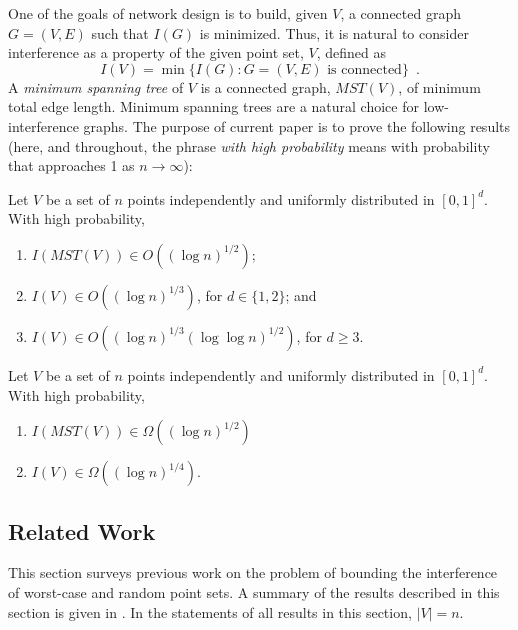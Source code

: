 \documentclass{patmorin}
\newcommand{\mst}{\mathit{MST}}
\begin{document}
One of the goals of network design is to build, given $V$, a connected
graph $G=(V,E)$ such that $I(G)$ is minimized.  Thus, it is natural to consider interference as a property of the given point set, $V$, defined as
\[
  I(V) = \min\{I(G) : \mbox{$G=(V,E)$ is connected}\} \enspace .
\]
A \emph{minimum spanning tree} of $V$ is a connected graph, $\mst(V)$,
of minimum total edge length.  Minimum spanning trees are a natural
choice for low-interference graphs.  The purpose of current paper
is to prove the following results (here, and throughout, the phrase
\emph{with high probability} means with probability that approaches 1
as $n\rightarrow\infty$):
\begin{thm}
  Let $V$ be a set of $n$ points independently and uniformly distributed
  in $[0,1]^d$.  With high probability,
\begin{enumerate}
  \item  $I(\mst(V))\in O((\log n)^{1/2})$;
  \item  $I(V)\in O((\log n)^{1/3})$, for $d\in\{1,2\}$; and 
  \item $I(V)\in O((\log n)^{1/3}(\log\log n)^{1/2})$, for $d\ge 3$.
\end{enumerate}
\end{thm}
\begin{thm}
  Let $V$ be a set of $n$ points independently and uniformly distributed
  in $[0,1]^d$.  With high probability, 
\begin{enumerate}
  \item $I(\mst(V))\in\Omega((\log n)^{1/2})$ 
  \item $I(V)\in \Omega((\log n)^{1/4})$.
\end{enumerate}
\end{thm}
\setcounter{thm}{3}

\subsection{Related Work}

This section surveys previous work on the problem of bounding the
interference of worst-case and random point sets.  A summary of the
results described in this section is given in .  In the
statements of all results in this section, $|V|=n$.
\end{document}
